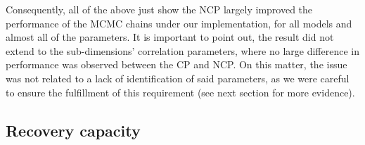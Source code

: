 \begin{comment}
The result appear to be sensible because of two factors, (i) as not only the different sub-dimensions are , but also beacuse the SOLV model was the data generating model.
\end{comment}

Consequently, all of the above just show the NCP largely improved the performance of the MCMC chains under our implementation, for all models and almost all of the parameters. It is important to point out, the result did not extend to the sub-dimensions' correlation parameters, where no large difference in performance was observed between the CP and NCP. On this matter, the issue was not related to a lack of identification of said parameters, as we were careful to ensure the fulfillment of this requirement (see next section for more evidence).


\subsection{Recovery capacity}


